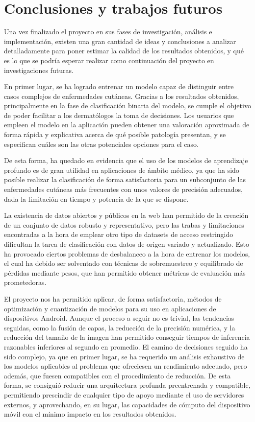 \chapter{Conclusiones y trabajos futuros}

Una vez finalizado el proyecto en sus fases de investigación, análisis e implementación, existen una gran cantidad de ideas y conclusiones a analizar detalladamente para poner estimar la calidad de los resultados obtenidos, y qué es lo que se podría esperar realizar como continuación del proyecto en investigaciones futuras.

En primer lugar, se ha logrado entrenar un modelo capaz de distinguir entre casos complejos de enfermedades cutáneas. Gracias a los resultados obtenidos, principalmente en la fase de clasificación binaria del modelo, se cumple el objetivo de poder facilitar a los dermatólogos la toma de decisiones.  Los usuarios que empleen el modelo en la aplicación pueden obtener una valoración aproximada de forma rápida y explicativa acerca de qué posible patología presentan, y se especifican cuáles son las otras potenciales opciones para el caso.

De esta forma, ha quedado en evidencia que el uso de los modelos de aprendizaje profundo es de gran utilidad en aplicaciones de ámbito médico, ya que ha sido posible realizar la clasificación de forma satisfactoria para un subconjunto de las enfermedades cutáneas más frecuentes con unos valores de precisión adecuados, dada la limitación en tiempo y potencia de la que se dispone. 

La existencia de datos abiertos  y públicos en la web han permitido de la creación de un conjunto de datos robusto y representativo, pero las trabas y limitaciones encontradas a la hora de emplear otro tipo de datasets de acceso restringido dificultan la tarea de clasificación con datos de origen variado y actualizado. Esto ha provocado ciertos problemas de desbalanceo a la hora de entrenar los modelos, el cual ha debido ser solventado con técnicas de sobremuestreo y equilibrado de pérdidas mediante pesos, que han permitido obtener métricas de evaluación más prometedoras.

El proyecto nos ha permitido aplicar, de forma satisfactoria, métodos de optimización y cuantización de modelos para su uso en aplicaciones de dispositivos Android. Aunque el proceso a seguir no es trivial, las tendencias seguidas, como la fusión de capas, la reducción de la precisión numérica, y la reducción del tamaño de la imagen han permitido conseguir tiempos de inferencia razonables inferiores al segundo en promedio. El camino de decisiones seguido ha sido complejo, ya que en primer lugar, se ha requerido un análisis exhaustivo de los modelos aplicables al problema que ofreciesen un rendimiento adecuado, pero además, que fuesen compatibles con el procedimiento de reducción. De esta forma, se consiguió reducir una arquitectura profunda preentrenada y compatible, permitiendo prescindir de cualquier tipo de apoyo mediante el uso de servidores externos, y aprovechando, en su lugar, las capacidades de cómputo del dispositivo móvil con el mínimo impacto en los resultados obtenidos.

